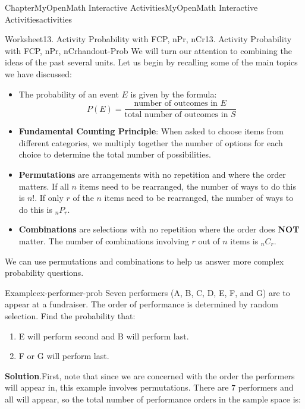 \documentclass[oneside,10pt,]{book}
\newcommand{\blocktitlefont}{\relax}
\newcommand{\ptxlistdisc}{\raisebox{0.3ex}{\textbullet}}
\newcommand{\terminology}[1]{\textbf{#1}}
\begin{document}
\begin{chapterptx}{Chapter}{MyOpenMath Interactive Activities}{}{MyOpenMath Interactive Activities}{}{}{activities}
%
%
\typeout{************************************************}
\typeout{************************************************}
%
\begin{worksheet-section}{Worksheet}{13. Activity Probability with FCP, nPr, nCr}{}{13. Activity Probability with FCP, nPr, nCr}{}{}{handout-Prob}
We will turn our attention to combining the ideas of the past several units. Let us begin by recalling some of the main topics we have discussed:%
\begin{itemize}[label=\ptxlistdisc]
\item{}The probability of an event \(E\) is given by the formula:%
%
\begin{equation*}
P(E) = \frac{\text{number of outcomes in } E}{\text{total number of outcomes in } S}
\end{equation*}
\item{}\terminology{Fundamental Counting Principle}: When asked to choose items from different categories, we multiply together the number of options for each choice to determine the total number of possibilities.%
\item{}\terminology{Permutations} are arrangements with no repetition and where the order matters. If all \(n\) items need to be rearranged, the number of ways to do this is \(n!\). If only \(r\) of the \(n\) items need to be rearranged, the number of ways to do this is \(_nP_r\).%
\item{}\terminology{Combinations} are selections with no repetition where the order does \terminology{NOT} matter. The number of combinations involving \(r\) out of \(n\) items is \(_nC_r\).%
\end{itemize}
We can use permutations and combinations to help us answer more complex probability questions.%
\begin{example}{Example}{}{ex-performer-prob}%
Seven performers (A, B, C, D, E, F, and G) are to appear at a fundraiser. The order of performance is determined by random selection. Find the probability that:%
\begin{enumerate}[label={\alph*}]
\item{}E will perform second and B will perform last.%
\item{}F or G will perform last.%
\end{enumerate}
%
\par\smallskip%
\noindent\textbf{\blocktitlefont Solution}.\hypertarget{ex-performer-prob-2}{}\quad{}First, note that since we are concerned with the order the performers will appear in, this example involves permutations. There are \(7\) performers and all will appear, so the total number of performance orders in the sample space is:%

\end{example}
\end{worksheet-section}
\end{chapterptx}
\end{document}
